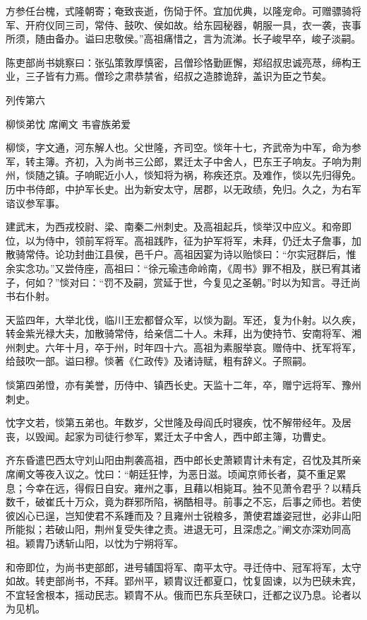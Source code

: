 \documentclass[12pt,UTF8]{ctexbook}
\begin{document}
方参任台槐，式隆朝寄；奄致丧逝，伤恸于怀。宜加优典，以隆宠命。可赠骠骑将军、开府仪同三司，常侍、鼓吹、侯如故。给东园秘器，朝服一具，衣一袭，丧事所须，随由备办。谥曰忠敬侯。”高祖痛惜之，言为流涕。长子峻早卒，峻子淡嗣。

陈吏部尚书姚察曰：张弘策敦厚慎密，吕僧珍恪勤匪懈，郑绍叔忠诚亮荩，缔构王业，三子皆有力焉。僧珍之肃恭禁省，绍叔之造膝诡辞，盖识为臣之节矣。





列传第六

柳惔弟忱 席阐文 韦睿族弟爱

柳惔，字文通，河东解人也。父世隆，齐司空。惔年十七，齐武帝为中军，命为参军，转主簿。齐初，入为尚书三公郎，累迁太子中舍人，巴东王子响友。子响为荆州，惔随之镇。子响昵近小人，惔知将为祸，称疾还京。及难作，惔以先归得免。历中书侍郎，中护军长史。出为新安太守，居郡，以无政绩，免归。久之，为右军谘议参军事。

建武末，为西戎校尉、梁、南秦二州刺史。及高祖起兵，惔举汉中应义。和帝即位，以为侍中，领前军将军。高祖践阼，征为护军将军，未拜，仍迁太子詹事，加散骑常侍。论功封曲江县侯，邑千户。高祖因宴为诗以贻惔曰：“尔实冠群后，惟余实念功。”又尝侍座，高祖曰：“徐元瑜违命岭南，《周书》罪不相及，朕已宥其诸子，何如？”惔对曰：“罚不及嗣，赏延于世，今复见之圣朝。”时以为知言。寻迁尚书右仆射。

天监四年，大举北伐，临川王宏都督众军，以惔为副。军还，复为仆射。以久疾，转金紫光禄大夫，加散骑常侍，给亲信二十人。未拜，出为使持节、安南将军、湘州刺史。六年十月，卒于州，时年四十六。高祖为素服举哀。赠侍中、抚军将军，给鼓吹一部。谥曰穆。惔著《仁政传》及诸诗赋，粗有辞义。子照嗣。

惔第四弟憕，亦有美誉，历侍中、镇西长史。天监十二年，卒，赠宁远将军、豫州刺史。

忱字文若，惔第五弟也。年数岁，父世隆及母阎氏时寝疾，忱不解带经年。及居丧，以毁闻。起家为司徒行参军，累迁太子中舍人，西中郎主簿，功曹史。

齐东昏遣巴西太守刘山阳由荆袭高祖，西中郎长史萧颖胄计未有定，召忱及其所亲席阐文等夜入议之。忱曰：“朝廷狂悖，为恶日滋。顷闻京师长者，莫不重足累息；今幸在远，得假日自安。雍州之事，且藉以相毙耳。独不见萧令君乎？以精兵数千，破崔氏十万众，竟为群邪所陷，祸酷相寻。前事之不忘，后事之师也。若使彼凶心已逞，岂知使君不系踵而及？且雍州士锐粮多，萧使君雄姿冠世，必非山阳所能拟；若破山阳，荆州复受失律之责。进退无可，且深虑之。”阐文亦深劝同高祖。颖胄乃诱斩山阳，以忱为宁朔将军。

和帝即位，为尚书吏部郎，进号辅国将军、南平太守。寻迁侍中、冠军将军，太守如故。转吏部尚书，不拜。郢州平，颖胄议迁都夏口，忱复固谏，以为巴硖未宾，不宜轻舍根本，摇动民志。颖胄不从。俄而巴东兵至硖口，迁都之议乃息。论者以为见机。
\end{document}
